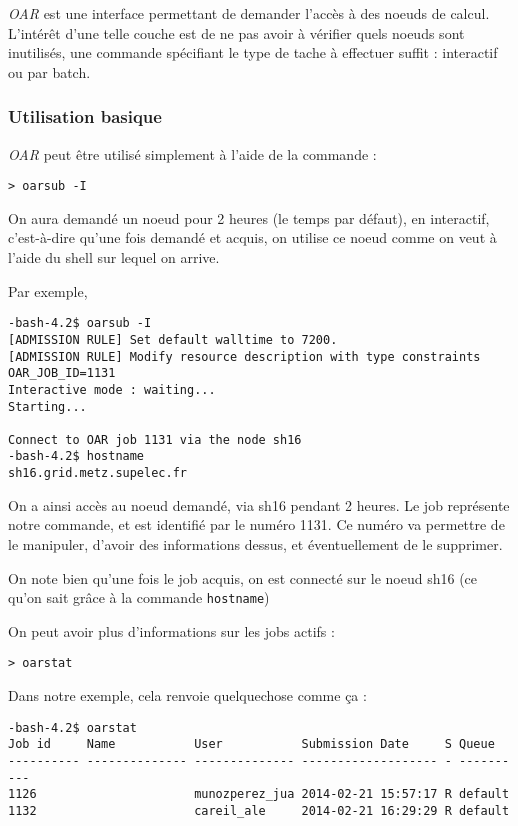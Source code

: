 \par \emph{OAR} est une interface permettant de demander l'accès à des noeuds de calcul. L'intérêt d'une telle couche est de ne pas avoir à vérifier quels noeuds sont inutilisés, une commande spécifiant le type de tache à effectuer suffit : interactif ou par batch.


\subsubsection{Utilisation basique}
\label{subsec:utilisation-basique}

\par \emph{OAR} peut être utilisé simplement à l'aide de la commande :
\begin{verbatim}
> oarsub -I
\end{verbatim}

\par On aura demandé un noeud pour 2 heures (le temps par défaut), en interactif, c'est-à-dire qu'une fois demandé et acquis, on utilise ce noeud comme on veut à l'aide du shell sur lequel on arrive.

\par Par exemple, 
\begin{verbatim}
-bash-4.2$ oarsub -I
[ADMISSION RULE] Set default walltime to 7200.
[ADMISSION RULE] Modify resource description with type constraints
OAR_JOB_ID=1131
Interactive mode : waiting...
Starting...

Connect to OAR job 1131 via the node sh16
-bash-4.2$ hostname
sh16.grid.metz.supelec.fr
\end{verbatim}
\par On a ainsi accès au noeud demandé, via sh16 pendant 2 heures. Le job représente notre commande, et est identifié par le numéro 1131. Ce numéro va permettre de le manipuler, d'avoir des informations dessus, et éventuellement de le supprimer.
\par On note bien qu'une fois le job acquis, on est connecté sur le noeud sh16 (ce qu'on sait grâce à la commande \texttt{hostname})

\par On peut avoir plus d'informations sur les jobs actifs :
\begin{verbatim}
> oarstat
\end{verbatim}

\par Dans notre exemple, cela renvoie quelquechose comme ça :
\begin{verbatim}
-bash-4.2$ oarstat
Job id     Name           User           Submission Date     S Queue
---------- -------------- -------------- ------------------- - ----------
1126                      munozperez_jua 2014-02-21 15:57:17 R default   
1132                      careil_ale     2014-02-21 16:29:29 R default   
\end{verbatim}

